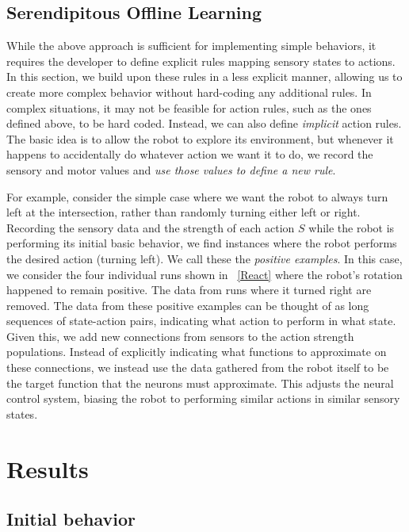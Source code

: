 \documentclass[conference]{IEEEtran}
\begin{document}
\subsection{Serendipitous Offline Learning} \label{learning}

While the above approach is sufficient for implementing simple behaviors, it requires the developer to define explicit rules mapping sensory states to actions. In this section, we build upon these
rules in a less explicit manner, allowing us to create more complex behavior
without hard-coding any additional rules.  In complex situations, it may not be 
feasible for action rules, such as the ones defined above, to be hard coded. Instead,
we can also define \textit{implicit} action rules. The basic idea is to allow
the robot to explore its environment, but whenever it happens to accidentally
do whatever action we want it to do, we record the sensory and motor 
values and \textit{use those values to define a new rule}.

For example, consider the simple case where we want the robot to always turn left at 
the intersection, rather than randomly turning either left or right. Recording 
the sensory data and the strength of each action $S$ while the robot is 
performing its initial basic behavior, we find instances where the robot 
performs the desired action (turning left). We call these the \textit{positive 
examples}. In this case, we consider the four individual runs shown in 
\figurename~\ref{React} where the robot's rotation happened to remain positive.  
The data from runs where it turned right are removed.  The data from these positive examples can 
be thought of as long sequences of state-action pairs, indicating what action 
to perform in what state. Given this, we add new connections from sensors to 
the action strength populations. Instead of explicitly indicating what functions 
to approximate on these connections, we instead use the data gathered from
the robot itself to be the target function that the neurons must approximate.
This adjusts the neural control system, biasing the robot to performing
similar actions in similar sensory states.

\section{Results}

\subsection{Initial behavior}
\end{document}
